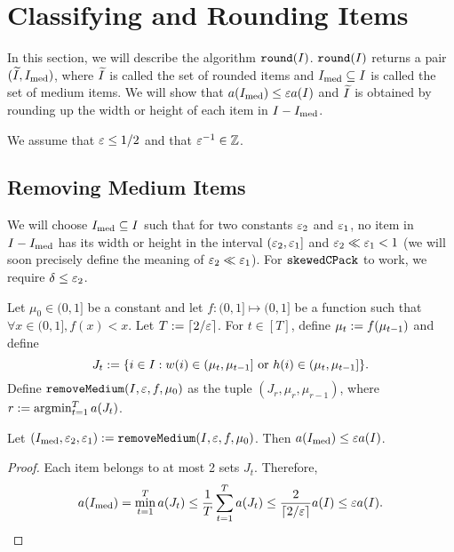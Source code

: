 \section{Classifying and Rounding Items}
\label{sec:thin-bp:round}

In this section, we will describe the algorithm $\operatorname{\mathtt{round}}(I)$.
$\operatorname{\mathtt{round}}(I)$ returns a pair $(\widetilde{I}, I_{\mathrm{med}})$, where $\widetilde{I}$
is called the set of rounded items and
$I_{\mathrm{med}} \subseteq I$ is called the set of medium items.
We will show that $a(I_{\mathrm{med}}) \le \varepsilon a(I)$ and
$\widetilde{I}$ is obtained by rounding up the width or height of each item in $I - I_{\mathrm{med}}$.

We assume that $\varepsilon \le 1/2$ and that $\varepsilon^{-1} \in \mathbb{Z}$.

\subsection{Removing Medium Items}
\label{sec:thin-bp:remmed}

We will choose $I_{\mathrm{med}} \subseteq I$ such that for two constants $\varepsilon_2$ and $\varepsilon_1$,
no item in $I - I_{\mathrm{med}}$ has its width or height in the interval $(\varepsilon_2, \varepsilon_1]$
and $\varepsilon_2 \ll \varepsilon_1 < 1$
(we will soon precisely define the meaning of $\varepsilon_2 \ll \varepsilon_1$).
For $\operatorname{\mathtt{skewedCPack}}$ to work, we require $\delta \le \varepsilon_2$.

\begin{definition}
\label{defn:thin-bp:remmed}
Let $\mu_0 \in (0, 1]$ be a constant and let
$f: (0, 1] \mapsto (0, 1]$ be a function such that $\forall x \in (0, 1], f(x) < x$.
Let $T := \left\lceil 2/\varepsilon \right\rceil$.
For $t \in [T]$, define $\mu_t := f(\mu_{t-1})$ and define
\[ J_t := \{i \in I: w(i) \in (\mu_t, \mu_{t-1}]
    \textrm{ or } h(i) \in (\mu_t, \mu_{t-1}]\}. \]
Define $\operatorname{\mathtt{removeMedium}}(I, \varepsilon, f, \mu_0)$ as the tuple $(J_r, \mu_r, \mu_{r-1})$,
where $r := \operatorname*{argmin}_{t=1}^T a(J_t)$.
\end{definition}

\begin{lemma}
\label{thm:thin-bp:remmed-area}
Let $(I_{\mathrm{med}}, \varepsilon_2, \varepsilon_1) := \operatorname{\mathtt{removeMedium}}(I, \varepsilon, f, \mu_0)$.
Then $a(I_{\mathrm{med}}) \le \varepsilon a(I)$.
\end{lemma}
\begin{proof}
Each item belongs to at most 2 sets $J_t$. Therefore,
\[ a(I_{\mathrm{med}}) = \min_{t=1}^T a(J_t)
\le \frac{1}{T} \sum_{t=1}^T a(J_t)
\le \frac{2}{\left\lceil 2/\varepsilon \right\rceil} a(I)
\le \varepsilon a(I). \qedhere \]
\end{proof}

